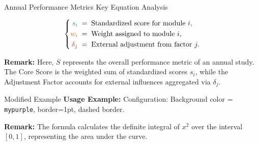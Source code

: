 \begin{frame}{Annual Performance Metrics}
  Key Equation Analysis

  \vspace{1em}

  \begin{center}
  \end{center}

  \vspace{1em}

  \[
    \left\{
    \begin{aligned}
      \textcolor{mygreen}{s_i} &\;=\; \text{Standardized score for module } i, \\
      \textcolor{myorange}{w_i} &\;=\; \text{Weight assigned to module } i, \\
      \textcolor{myred}{\delta_j} &\;=\; \text{External adjustment from factor } j.
    \end{aligned}
    \right.
  \]

  \vspace{1em}

  \textbf{Remark:} Here, \(S\) represents the overall performance metric of an annual study. The \textcolor{midblue}{Core Score} is the weighted sum of standardized scores \(s_i\), while the \textcolor{mypurple}{Adjustment Factor} accounts for external influences aggregated via \(\delta_j\).

\end{frame}



\begin{frame}{Modified Example}
  \textbf{Usage Example:} Configuration: Background color = \texttt{mypurple}, border=1pt, dashed border.
  \vspace{1em}


  \begin{center}
  \end{center}

  \vspace{1em}

  \textbf{Remark:} The formula calculates the definite integral of \(x^2\) over the interval \([0,1]\), representing the area under the curve.
\end{frame}


